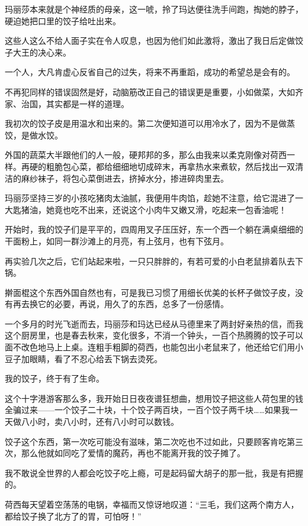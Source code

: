 \par 玛丽莎本来就是个神经质的母亲，这一唬，拎了玛达便往洗手间跑，掏她的脖子，硬迫她把口里的饺子给吐出来。
\par 这些人这么不给人面子实在令人叹息，也因为他们如此激将，激出了我日后定做饺子大王的决心来。
\par 一个人，大凡肯虚心反省自己的过失，将来不再重蹈，成功的希望总是会有的。
\par 不再犯同样的错误固然是好，动脑筋改正自己的错误更是重要，小如做菜，大如齐家、治国，其实都是一样的道理。
\par 我初次的饺子皮是用温水和出来的。第二次便知道可以用冷水了，因为不是做蒸饺，是做水饺。
\par 外国的蔬菜大半跟他们的人一般，硬邦邦的多，那么由我来以柔克刚像对荷西一样。再硬的粗脆包心菜，都给细细地切成碎末，再拿热水来煮软，然后找出一双清洁的麻纱袜子，将包心菜倒进去，挤掉水分，掺进碎肉里去。
\par 玛丽莎坚持三岁的小孩吃猪肉太油腻，我便用牛肉馅，趁她不注意，给它混进了一大匙猪油，她竟也吃不出来，还说这个小肉牛又嫩又滑，吃起来一包香油呢！
\par 开始时，我的饺子们是平平的，四周用叉子压压好，东一个西一个躺在满桌细细的干面粉上，如同一群沙滩上的月亮，有上弦月，也有下弦月。
\par 再实验几次之后，它们站起来啦，一只只胖胖的，有若可爱的小白老鼠排着队去下锅。
\par 擀面棍这个东西外国自然也有，可是我已习惯了用细长优美的长杯子做饺子皮，没有再去换它的必要，再说，用久了的东西，总多了一份感情。
\par 一个多月的时光飞逝而去，玛丽莎和玛达已经从马德里来了两封好亲热的信，而我这个厨房里，也是春去秋来，变化很多，不消一个钟头，一百个热腾腾的饺子可以面不改色地马上上桌。连粗手粗脚的荷西，也能包出小老鼠来了，他还给它们用小豆子加眼睛，看了不忍心给丢下锅去烫死。
\par 我的饺子，终于有了生命。
\par 这个十字港游客那么多，我开始日日夜夜谱狂想曲，想用饺子把这些人荷包里的钱全骗过来——一个饺子二十块，十个饺子两百块，一百个饺子两千块……如果我一天做八小时，卖八小时，还有八小时可以数钱。
\par 饺子这个东西，第一次吃可能没有滋味，第二次吃也不过如此，只要顾客肯吃第三次，那么他就如同吃了爱情的魔药，再也不能离开我的饺子摊了。
\par 我不敢说全世界的人都会吃饺子吃上瘾，可是起码留大胡子的那一批，我是有把握的。
\par 荷西每天望着空荡荡的电锅，幸福而又惊讶地叹道：“三毛，我们这两个南方人，都给饺子换了北方了的胃，可怕呀！”
